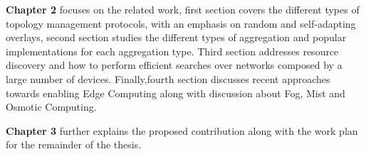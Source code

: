 \textbf{Chapter 2} focuses on the related work, first section covers the different types of topology management protocols,
with an emphasis on random and self-adapting overlays, second section studies the different types of aggregation and  popular implementations for each aggregation type. Third section addresses resource discovery and how to perform efficient searches over networks composed by a large number of devices. Finally,fourth section discusses recent approaches towards enabling Edge Computing along with discussion about Fog, Mist and Osmotic Computing.

\textbf{Chapter 3} further explains the proposed contribution along with the work plan for the remainder of the thesis. 


